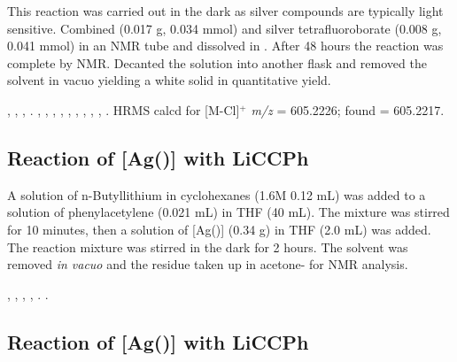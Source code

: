 This reaction was carried out in the dark as silver compounds are typically light sensitive.  Combined \tBuxantphos{} (0.017 g, 0.034 mmol) and silver tetrafluoroborate (0.008 g, 0.041 mmol) in an NMR tube and dissolved in .  After 48 hours the reaction was complete by NMR.  Decanted the solution into another flask and removed the solvent in vacuo yielding a white solid in quantitative yield.  

,
,
,
.
,
,
,
,
,
,
,
,
,
.
HRMS calcd for  [M-Cl]$^+$ \emph{m/z} = 605.2226; found = 605.2217.

\subsection*{Reaction of \texorpdfstring{[Ag(\tBusixantphos)]} A with LiCCPh}

A solution of n-Butyllithium in cyclohexanes (1.6M 0.12 mL) was added to a solution of phenylacetylene (0.021 mL) in THF (40 mL).  The mixture was stirred for 10 minutes, then a solution of [Ag(\tBusixantphos)] (0.34 g) in THF (2.0 mL) was added.  The reaction mixture was stirred in the dark for 2 hours.  The solvent was removed \emph{in vacuo} and the residue taken up in acetone- for NMR analysis.   

,
,
,
,
.
.

\subsection*{Reaction of \texorpdfstring{[Ag(\tButhixantphos)]} A with LiCCPh}

